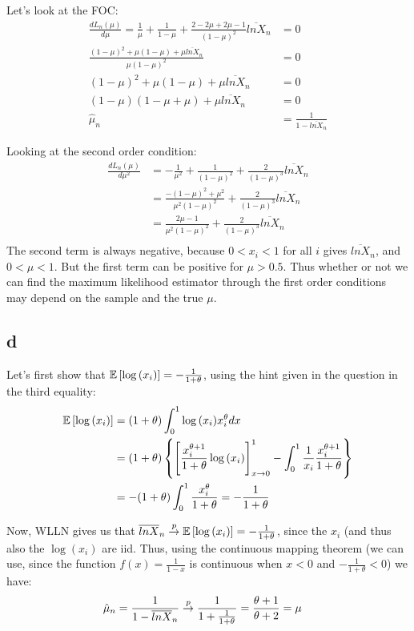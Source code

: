\documentclass[12pt]{paper}
\begin{document}
Let's look at the FOC:
\begin{align*}
\frac{dL_n(\mu)}{d\mu}=\frac{1}{\mu}+\frac{1}{1-\mu}+\frac{2-2\mu+2\mu-1}{(1-\mu)^2}\overline{lnX}_n&=0\\
\frac{(1-\mu)^2+\mu(1-\mu)+\mu\overline{lnX}_n}{\mu(1-\mu)^2}&=0\\
(1-\mu)^2+\mu(1-\mu)+\mu\overline{lnX}_n&=0\\
(1-\mu)(1-\mu+\mu)+\mu\overline{lnX}_n&=0\\
\hat{\mu}_n&=\frac{1}{1-\overline{lnX}_n}
\end{align*}

Looking at the second order condition:
\begin{align*}
\frac{dL_n(\mu)}{d\mu^2}&=-\frac{1}{\mu^2}+\frac{1}{(1-\mu)^2}+\frac{2}{(1-\mu)^3}\overline{lnX}_n\\
&=\frac{-(1-\mu)^2+\mu^2}{\mu^2(1-\mu)^2}+\frac{2}{(1-\mu)^3}\overline{lnX}_n\\
&=\frac{2\mu-1}{\mu^2(1-\mu)^2}+\frac{2}{(1-\mu)^3}\overline{lnX}_n\\
\end{align*}
\noindent The second term is always negative, because $0<x_i<1$ for all $i$ gives $\overline{lnX}_n$, and $0<\mu<1$. But the first term can be positive for $\mu>0.5$. Thus whether or not we can find the maximum likelihood estimator through the first order conditions may depend on the sample and the true $\mu$.

\subsection*{d}

Let's first show that $\mathbb{E} \left [ \log{(x_i)} \right ]=-\frac{1}{1+\theta}$, using the hint given in the question in the third equality:
\begin{align*}
\mathbb{E} \left [ \log{(x_i)} \right ]&=(1+\theta)\int^1_0{\log{(x_i)}x_i^{\theta}dx}\\
&=(1+\theta)\left\{ \left[\frac{x_i^{\theta+1}}{1+\theta}\log{(x_i)}\right]^{1}_{x\to0} -\int^1_0{\frac{1}{x_i}\frac{x_i^{\theta+1}}{1+\theta}}\right\}\\
&=-(1+\theta)\int^1_0{\frac{x_i^{\theta}}{1+\theta}}=-\frac{1}{1+\theta}
\end{align*}

Now, WLLN gives us that $\overline{lnX}_n\overset{p}{\to}\mathbb{E} \left [ \log{(x_i)} \right ]=-\frac{1}{1+\theta}$, since the $x_i$ (and thus also the $\log(x_i)$ are iid. Thus, using the continuous mapping theorem (we can use, since the function $f(x)=\frac{1}{1-x}$ is continuous when $x<0$ and $-\frac{1}{1+\theta}<0$) we have:
\begin{align*}
\hat{\mu}_n&=\frac{1}{1-\overline{lnX}_n}\overset{p}{\to}\frac{1}{1+\frac{1}{1+\theta}}=\frac{\theta+1}{\theta+2}=\mu
\end{align*}
\end{document}
